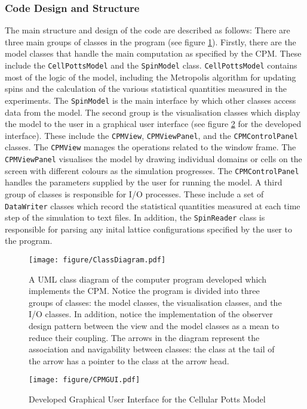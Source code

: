 \documentclass[a4paper,12pt]{article}
\begin{document}
\subsubsection{Code Design and Structure}
The main structure and design of the code are described as follows: There are three main groups of classes in the program (see figure \ref{fig:ClassDiagram}). Firstly, there are the model classes that handle the main computation as specified by the CPM. These include the \texttt{CellPottsModel} and the \texttt{SpinModel} class. \texttt{CellPottsModel} contains most of the logic of the model, including the Metropolis algorithm for updating spins and the calculation of the various statistical quantities measured in the experiments. The \texttt{SpinModel} is the main interface by which other classes access data from the model. The second group is the visualisation classes which display the model to the user in a graphical user interface (see figure \ref{fig:CPMGUI} for the developed interface). These include the \texttt{CPMView}, \texttt{CPMViewPanel}, and the \texttt{CPMControlPanel} classes. The \texttt{CPMView} manages the operations related to the window frame. The \texttt{CPMViewPanel} visualises the model by drawing individual domains or cells on the screen with different colours as the simulation progresses. The \texttt{CPMControlPanel} handles the parameters supplied by the user for running the model.  A third group of classes is responsible for I/O processes. These include a set of \texttt{DataWriter} classes which record the statistical quantities measured at each time step of the simulation to text files. In addition, the \texttt{SpinReader} class is responsible for parsing any inital lattice configurations specified by the user to the program.  
\begin{figure}[h]
\centering
\texttt{[image: figure/ClassDiagram.pdf]}
\caption{A UML class diagram of the computer program developed which implements the CPM. Notice the program is divided into three groups of classes: the model classes, the visualisation classes, and the I/O classes. In addition, notice the implementation of the observer design pattern between the view and the model classes as a mean to reduce their coupling. The arrows in the diagram represent the association and navigability between classes: the class at the tail of the arrow has a pointer to the class at the arrow head.}
\label{fig:ClassDiagram}
\end{figure}
\begin{figure}[h]
\centering
\texttt{[image: figure/CPMGUI.pdf]}
\caption{Developed Graphical User Interface for the Cellular Potts Model}
\label{fig:CPMGUI}
\end{figure}
\FloatBarrier
\end{document}
